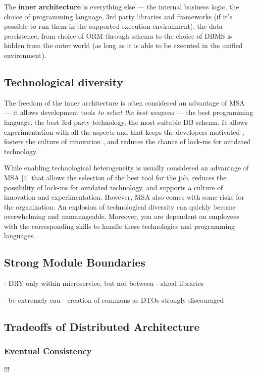 \documentclass[thesis=M,english,hidelinks]{FITthesis}[2012/10/20]
\begin{document}
The \textbf{inner architecture} is everything else --- the internal business logic, the choice of programming language, 3rd party libraries and frameworks (if it's possible to run them in the supported execution environment), the data persistence, from choice of \acrshort{ORM} through schema to the choice of \acrshort{DBMS} is hidden from the outer world (as long as it is able to be executed in the unified environment).

\subsection{Technological diversity}
The freedom of the inner architecture is often considered an advantage of \acrshort{MSA} --- it allows development tools \textit{to select the best weapons} --- the best programming language, the best 3rd party technology, the most suitable \acrshort{DB} schema. It allows experimentation with all the aspects and that keeps the developers motivated \cite{ms-building-ms, ms-3-pillars}, fosters the culture of innovation \cite{innovation-well-oiled-machine}, and reduces the chance of lock-ins for outdated technology.


While enabling technological heterogeneity is usually considered an advantage of MSA [4] that allows the selection of the best tool for the job, reduces the possibility of lock-ins for outdated technology, and supports a culture of innovation and experimentation. However, MSA also comes with some risks for the organization. An explosion of technological diversity can quickly become overwhelming and unmanageable. Moreover, you are dependent on employees with the corresponding skills to handle these technologies and programming languages.


\subsection{Strong Module Boundaries}
- DRY only within microservice, but not between
- shred libraries

- be extremely cau
- creation of commons as DTOs strongly discouraged


\subsection{Tradeoffs of Distributed Architecture}
\label{sec:tradeoffs}
\subsubsection{Eventual Consistency}
!!!
\end{document}
